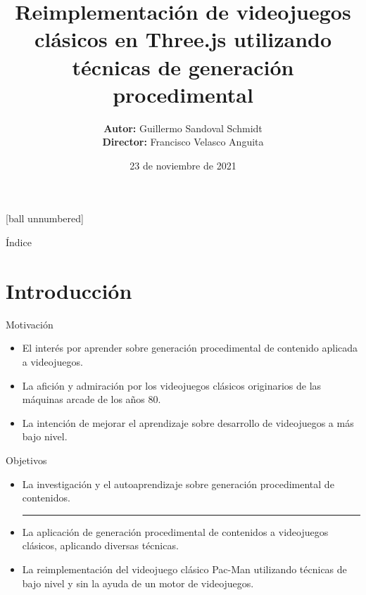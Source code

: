 \documentclass{beamer}
\title{Reimplementación de videojuegos clásicos en Three.js utilizando técnicas de generación procedimental}
\author{
    \textbf{Autor:} Guillermo Sandoval Schmidt\\
    \textbf{Director:} Francisco Velasco Anguita
}
\institute[UGR]{Universidad de Granada\\
\medskip
\url{https://github.com/Gsandoval96/TFG-UGR}
}
\date{23 de noviembre de 2021}
\begin{document}

\maketitle

[ball unnumbered]
\begin{frame}{Índice}
    \tableofcontents
\end{frame}


\section{Introducción}

    \begin{frame}{Motivación \scriptsize{\hfill \secname}}
        \begin{itemize}
        \item El interés por aprender sobre generación procedimental de contenido aplicada a videojuegos.
        \item La afición y admiración por los videojuegos clásicos originarios de las máquinas arcade de los años 80.
        \item La intención de mejorar el aprendizaje sobre desarrollo de videojuegos a más bajo nivel.
    \end{itemize}
    \end{frame}

    \begin{frame}{Objetivos \scriptsize{\hfill \secname}}
    
    \begin{itemize}
        \item La investigación y el autoaprendizaje sobre generación procedimental de contenidos.
        \rule{9cm}{0.4pt}
        \item La aplicación de generación procedimental de contenidos a videojuegos clásicos, aplicando diversas técnicas.
        \item La reimplementación del videojuego clásico Pac-Man utilizando técnicas de bajo nivel y sin la ayuda de un motor de videojuegos.
    \end{itemize}
        
    \end{frame}
\end{document}

